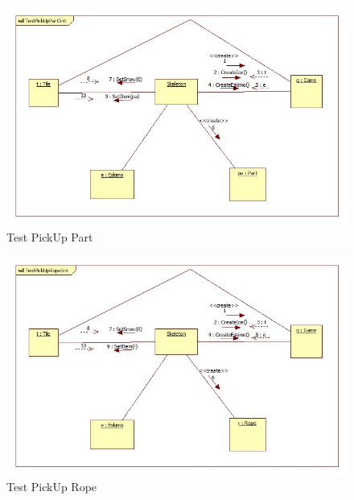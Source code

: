 \begin{figure}[h]
	\begin{center}
		\includegraphics[width=17cm]{chapters/chapter05/diagrams/TestPickUpPartInit.jpg}
		\caption{Test PickUp Part}
		\label{fig:Test PickUp Part}
	\end{center}
\end{figure}

\begin{figure}[h]
	\begin{center}
		\includegraphics[width=17cm]{chapters/chapter05/diagrams/TestPickUpRopeInit.jpg}
		\caption{Test PickUp Rope}
		\label{fig:Test PickUp Rope}
	\end{center}
\end{figure}

